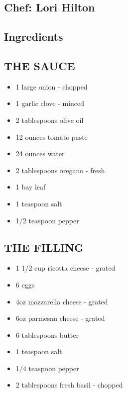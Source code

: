 \documentclass[
]{book}
\providecommand{\tightlist}{%
  \setlength{\itemsep}{0pt}\setlength{\parskip}{0pt}}
\begin{document}
\hypertarget{chef-lori-hilton-3}{%
\subsection*{Chef: Lori Hilton}\label{chef-lori-hilton-3}}


\hypertarget{ingredients-46}{%
\subsection*{Ingredients}\label{ingredients-46}}


\hypertarget{the-sauce}{%
\subsection*{THE SAUCE}\label{the-sauce}}


\begin{itemize}
\tightlist
\item
  1 large onion - chopped
\item
  1 garlic clove - minced
\item
  2 tablespoons olive oil
\item
  12 ounces tomato paste
\item
  24 ounces water
\item
  2 tablespoons oregano - fresh
\item
  1 bay leaf
\item
  1 teaspoon salt
\item
  1/2 teaspoon pepper
\end{itemize}

\hypertarget{the-filling}{%
\subsection*{THE FILLING}\label{the-filling}}


\begin{itemize}
\tightlist
\item
  1 1/2 cup ricotta cheese - grated
\item
  6 eggs
\item
  4oz mozzarella cheese - grated
\item
  6oz parmesan cheese - grated
\item
  6 tablespoons butter
\item
  1 teaspoon salt
\item
  1/4 teaspoon pepper
\item
  2 tablespoons fresh basil - chopped
\end{itemize}
\end{document}
